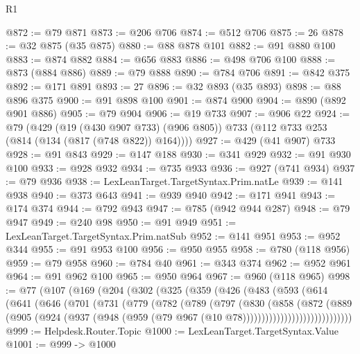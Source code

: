 \begin{lexlean}{R1}
\begin{coremodule}
{{{{{{{{{{{{{{{{{{{{{{{{{{{{{{{{{{{{{{{{{{{{{{{{{{{{{{{{{@872 := @79 @871
@873 := @206 @706
@874 := @512 @706
@875 := 26
@878 := @32 @875 (@35 @875)
@880 := @88 @878 @101
@882 := @91 @880 @100
@883 := @874 @882
@884 := @656 @883
@886 := @498 @706 @100
@888 := @873 (@884 @886)
@889 := @79 @888
@890 := @784 @706
@891 := @842 @375
@892 := @171 @891
@893 := 27
@896 := @32 @893 (@35 @893)
@898 := @88 @896 @375
@900 := @91 @898 @100
@901 := @874 @900
@904 := @890 (@892 @901 @886)
@905 := @79 @904
@906 := @19 @733
@907 := @906 @22
@924 := @79
    (@429
      (@19 (@430 @907 @733) (@906 @805))
      @733
      (@112 @733 @253 (@814 (@134 (@817 (@748 @822)) @164))))
@927 := @429 (@41 @907) @733
@928 := @91 @843
@929 := @147 @188
@930 := @341 @929
@932 := @91 @930 @100
@933 := @928 @932
@934 := @735 @933
@936 := @927 (@741 @934)
@937 := @79 @936
@938 := LexLeanTarget.TargetSyntax.Prim.natLe
@939 := @141 @938
@940 := @373 @643
@941 := @939 @940
@942 := @171 @941
@943 := @174 @374
@944 := @792 @943
@947 := @785 (@942 @944 @287)
@948 := @79 @947
@949 := @240 @98
@950 := @91 @949
@951 := LexLeanTarget.TargetSyntax.Prim.natSub
@952 := @141 @951
@953 := @952 @344
@955 := @91 @953 @100
@956 := @950 @955
@958 := @780 (@118 @956)
@959 := @79 @958
@960 := @784 @40
@961 := @343 @374
@962 := @952 @961
@964 := @91 @962 @100
@965 := @950 @964
@967 := @960 (@118 @965)
@998 := @77
    (@107
      (@169
        (@204
          (@302
            (@325
              (@359
                (@426
                  (@483
                    (@593
                      (@614
                        (@641
                          (@646
                            (@701
                              (@731
                                (@779
                                  (@782
                                    (@789
                                      (@797
                                        (@830
                                          (@858
                                            (@872
                                              (@889
                                                (@905
                                                  (@924
                                                    (@937
                                                      (@948
                                                        (@959
                                                          (@79
                                                            @967
                                                            (@10 @78)))))))))))))))))))))))))))))
@999 := Helpdesk.Router.Topic
@1000 := LexLeanTarget.TargetSyntax.Value
@1001 := @999 -> @1000
}}}}}}}}}}}}}}}}}}}}}}}}}}}}}}}}}}}}}}}}}}}}}}}}}}}}}}}}}
\end{coremodule}
\end{lexlean}
